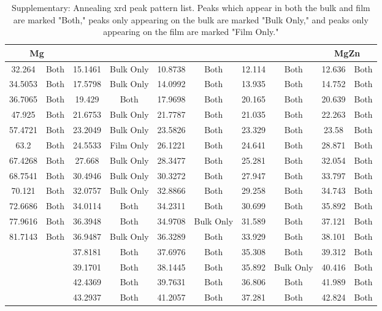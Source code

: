 \documentclass[a4paper,12pt,oneside]{article}%
\begin{document}
\begin{table}[b]
	\centering
	\caption{Supplementary: Annealing \acrshort{xrd} peak pattern list. Peaks which appear in both the bulk and film are marked "Both," peaks only appearing on the bulk are marked "Bulk Only," and peaks only appearing on the film are marked "Film Only."}
	\begin{tabular}{cccccccccc}
		\toprule
		\multicolumn{2}{c}{Mg} & \multicolumn{2}{c}{\MgZn} & \multicolumn{2}{c}{\CaMgZnFive} & \multicolumn{2}{c}{\CaMgZnThirteen} & \multicolumn{2}{c}{MgZn} \\
		\midrule
		32.264 & Both & 15.1461 & Bulk Only & 10.8738 & Both & 12.114 & Both & 12.636 & Both \\
		34.5053 & Both & 17.5798 & Bulk Only & 14.0992 & Both & 13.935 & Both & 14.752 & Both \\
		36.7065 & Both & 19.429 & Both & 17.9698 & Both & 20.165 & Both & 20.639 & Both \\
		47.925 & Both & 21.6753 & Bulk Only & 21.7787 & Both & 21.035 & Both & 22.263 & Both \\
		57.4721 & Both & 23.2049 & Bulk Only & 23.5826 & Both & 23.329 & Both & 23.58 & Both \\
		63.2 & Both & 24.5533 & Film Only & 26.1221 & Both & 24.641 & Both & 28.871 & Both \\
		67.4268 & Both & 27.668 & Bulk Only & 28.3477 & Both & 25.281 & Both & 32.054 & Both \\
		68.7541 & Both & 30.4946 & Bulk Only & 30.3272 & Both & 27.947 & Both & 33.797 & Both \\
		70.121 & Both & 32.0757 & Bulk Only & 32.8866 & Both & 29.258 & Both & 34.743 & Both \\
		72.6686 & Both & 34.0114 & Both & 34.2311 & Both & 30.699 & Both & 35.892 & Both \\
		77.9616 & Both & 36.3948 & Both & 34.9708 & Bulk Only & 31.589 & Both & 37.121 & Both \\
		81.7143 & Both & 36.9487 & Bulk Only & 36.3289 & Both & 33.929 & Both & 38.101 & Both \\
		&  & 37.8181 & Both & 37.6976 & Both & 35.308 & Both & 39.312 & Both \\
		&  & 39.1701 & Both & 38.1445 & Both & 35.892 & Bulk Only & 40.416 & Both \\
		&  & 42.4369 & Both & 39.7631 & Both & 36.806 & Both & 41.989 & Both \\
		&  & 43.2937 & Both & 41.2057 & Both & 37.281 & Both & 42.824 & Both \\

\end{tabular}
\end{table}
\end{document}
